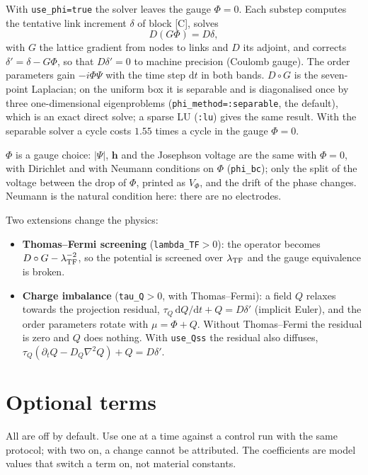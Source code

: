 \documentclass[11pt,a4paper]{article}
\newcommand{\code}[1]{\texttt{#1}}
\begin{document}
With \code{use\_phi=true} the solver leaves the gauge $\Phi=0$. Each
substep computes the tentative link increment $\delta$ of block [C],
solves
\begin{equation}
  D(G\Phi) = D\delta ,
\end{equation}
with $G$ the lattice gradient from nodes to links and $D$ its adjoint, and
corrects $\delta'=\delta-G\Phi$, so that $D\delta'=0$ to machine precision
(Coulomb gauge). The order parameters gain $-i\Phi\Psi$ with the time step
$\mathrm dt$ in both bands. $D\circ G$ is the seven-point Laplacian; on the
uniform box it is separable and is diagonalised once by three
one-dimensional eigenproblems (\code{phi\_method=:separable}, the default),
which is an exact direct solve; a sparse LU (\code{:lu}) gives the same
result. With the separable solver a cycle costs $1.55$ times a cycle in
the gauge $\Phi=0$.

$\Phi$ is a gauge choice: $|\Psi|$, $\mathbf h$ and the Josephson voltage
are the same with $\Phi=0$, with Dirichlet and with Neumann conditions on
$\Phi$ (\code{phi\_bc}); only the split of the voltage between the drop of
$\Phi$, printed as $V_\Phi$, and the drift of the phase changes. Neumann is
the natural condition here: there are no electrodes.

Two extensions change the physics:
\begin{itemize}
\item \textbf{Thomas--Fermi screening} (\code{lambda\_TF}$>0$): the operator
  becomes $D\circ G-\lambda_{\rm TF}^{-2}$, so the potential is screened
  over $\lambda_{\rm TF}$ and the gauge equivalence is broken.
\item \textbf{Charge imbalance} (\code{tau\_Q}$>0$, with Thomas--Fermi): a
  field $Q$ relaxes towards the projection residual,
  $\tau_Q\,\mathrm dQ/\mathrm dt+Q=D\delta'$ (implicit Euler), and the
  order parameters rotate with $\mu=\Phi+Q$. Without Thomas--Fermi the
  residual is zero and $Q$ does nothing. With \code{use\_Qss} the residual
  also diffuses, $\tau_Q(\partial_tQ-D_Q\nabla^2Q)+Q=D\delta'$.
\end{itemize}

\section{Optional terms}

All are off by default. Use one at a time against a control run with the
same protocol; with two on, a change cannot be attributed. The coefficients
are model values that switch a term on, not material constants.
\end{document}
